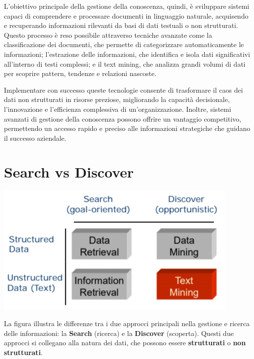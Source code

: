 \documentclass{report}
\begin{document}
	L'obiettivo principale della gestione della conoscenza, quindi, è sviluppare sistemi capaci di comprendere e processare documenti in linguaggio naturale, acquisendo e recuperando informazioni rilevanti da basi di dati testuali o non strutturati. Questo processo è reso possibile attraverso tecniche avanzate come la classificazione dei documenti, che permette di categorizzare automaticamente le informazioni; l'estrazione delle informazioni, che identifica e isola dati significativi all'interno di testi complessi; e il text mining, che analizza grandi volumi di dati per scoprire pattern, tendenze e relazioni nascoste. 
	
	Implementare con successo queste tecnologie consente di trasformare il caos dei dati non strutturati in risorse preziose, migliorando la capacità decisionale, l'innovazione e l'efficienza complessiva di un'organizzazione. Inoltre, sistemi avanzati di gestione della conoscenza possono offrire un vantaggio competitivo, permettendo un accesso rapido e preciso alle informazioni strategiche che guidano il successo aziendale.
	
	\section{Search vs Discover}
	\begin{center}
		\includegraphics[scale=0.6]{assets/searchvsdiscover.png}
	\end{center}
	La figura illustra le differenze tra i due approcci principali nella gestione e ricerca delle informazioni: la \textbf{Search} (ricerca) e la \textbf{Discover} (scoperta). Questi due approcci si collegano alla natura dei dati, che possono essere \textbf{strutturati} o \textbf{non strutturati}.
\end{document}
